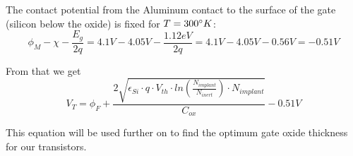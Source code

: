 The contact potential from the Aluminum contact to the surface of the gate (silicon below the oxide) is fixed for $T=300\degree K$:
\begin{equation}
\phi_{M} -  \chi - \frac{E_g}{2 q} = 4.1V - 4.05V - \frac{1.12eV}{2 q} = 4.1V - 4.05V - 0.56V = -0.51V
\end{equation}

From that we get
\begin{equation}
V_T = \phi_F + \frac{2 \sqrt{\epsilon_{Si}\cdot q\cdot V_{th}\cdot ln\left(\frac{N_{implant}}{N_{inert}}\right) \cdot N_{implant} }}{C_{ox}} - 0.51V
\end{equation}

This equation will be used further on to find the optimum gate oxide thickness for our transistors.
